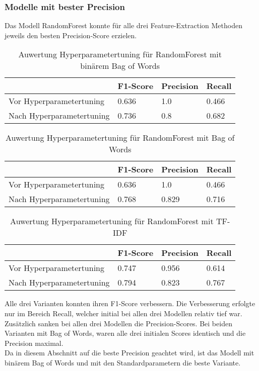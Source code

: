 \subsubsection{Modelle mit bester Precision}
Das Modell RandomForest konnte für alle drei Feature-Extraction Methoden jeweils den besten Precision-Score erzielen.\\
\begin{table}
	\caption{Auwertung Hyperparametertuning für RandomForest mit binärem Bag of Words}
	\centering
	\begin{tabular}{|l|l|l|l|}
		\hline
		& F1-Score & Precision & Recall\\
		\hline
		Vor Hyperparametertuning & 0.636 & 1.0 & 0.466 \\
		Nach Hyperparametertuning & 0.736 & 0.8 & 0.682 \\
		\hline
	\end{tabular}
\end{table}
\begin{table}
	\caption{Auwertung Hyperparametertuning für RandomForest mit Bag of Words}
	\centering
	\begin{tabular}{|l|l|l|l|}
		\hline
		& F1-Score & Precision & Recall\\
		\hline
		Vor Hyperparametertuning & 0.636 & 1.0 & 0.466 \\
		Nach Hyperparametertuning & 0.768 & 0.829 & 0.716 \\
		\hline
	\end{tabular}
\end{table}
\begin{table}
	\caption{Auwertung Hyperparametertuning für RandomForest mit TF-IDF}
	\centering
	\begin{tabular}{|l|l|l|l|}
		\hline
		& F1-Score & Precision & Recall\\
		\hline
		Vor Hyperparametertuning & 0.747 & 0.956 & 0.614 \\
		Nach Hyperparametertuning & 0.794 & 0.823 & 0.767 \\
		\hline
	\end{tabular}
\end{table}
Alle drei Varianten konnten ihren F1-Score verbessern.
Die Verbesserung erfolgte nur im Bereich Recall, welcher initial bei allen drei Modellen relativ tief war.
Zusätzlich sanken bei allen drei Modellen die Precision-Scores.
Bei beiden Varianten mit Bag of Words, waren alle drei initialen Scores identisch und die Precision maximal.\\
Da in diesem Abschnitt auf die beste Precision geachtet wird, ist das Modell mit binärem Bag of Words und mit den Standardparametern die beste Variante.